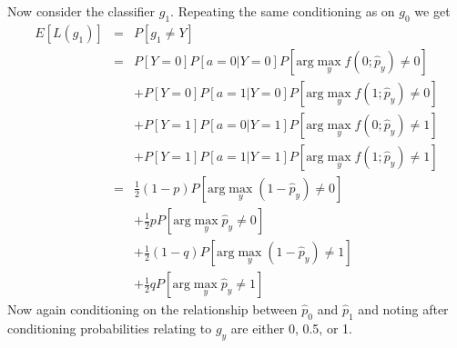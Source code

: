 \documentclass{article}
\begin{document}
Now consider the classifier $g_1$. Repeating the same conditioning as on $g_0$ we get
\begin{eqnarray}
E[L(g_1)] &=& P[g_1 \neq Y]
\\
 &=& P[Y=0] P[a=0| Y=0] P[\textrm{arg} \max_y f(0 ; \hat{p}_y ) \neq 0]
\\&& + P[Y=0] P[a=1| Y=0] P[\textrm{arg} \max_y f(1 ; \hat{p}_y ) \neq 0]
\\&& + P[Y=1] P[a=0| Y=1] P[\textrm{arg} \max_y f(0 ; \hat{p}_y ) \neq 1]
\\&& + P[Y=1] P[a=1| Y=1] P[\textrm{arg} \max_y f(1 ; \hat{p}_y ) \neq 1]
\\
 &=& \frac{1}{2} (1-p) P[\textrm{arg} \max_y (1-\hat{p}_y) \neq 0]
\\&& + \frac{1}{2} p P[\textrm{arg} \max_y \hat{p}_y \neq 0]
\\&& + \frac{1}{2} (1-q) P[\textrm{arg} \max_y (1-\hat{p}_y) \neq 1]
\\&& + \frac{1}{2} q P[\textrm{arg} \max_y \hat{p}_y  \neq 1]
\end{eqnarray}
Now again conditioning on the relationship between $\hat{p}_0$ and $\hat{p}_1$ and noting after conditioning probabilities relating to $g_y$ are either 0, 0.5, or 1.
\end{document}
